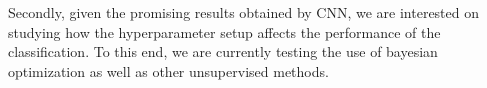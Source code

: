 \documentclass{sig-alternate}
\begin{document}
Secondly, given the promising results obtained by CNN, we are
interested on studying how the hyperparameter setup affects the 
performance of the classification. To this end, we are currently testing
the use of bayesian optimization as well as other unsupervised methods.



%

%
%
\end{document}
